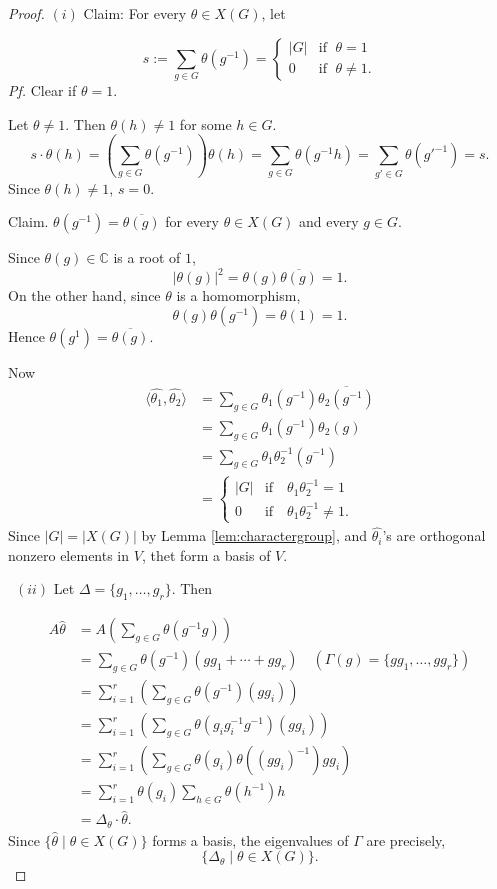 \documentclass[
]{book}
\theoremstyle{definition}
\theoremstyle{definition}
\theoremstyle{definition}
\theoremstyle{definition}
\theoremstyle{remark}
\begin{document}
\begin{proof}
\leavevmode

\((i)\) Claim: For every \(\theta \in X(G)\), let

\[s:= \sum_{g\in G}\theta(g^{-1}) = \begin{cases} |G| & \text{if }\;\theta = 1\\
0 & \text{if } \;\theta \neq 1. 
\end{cases}\]
\emph{Pf.} Clear if \(\theta =1\).

Let \(\theta \neq 1\). Then \(\theta(h)\neq 1\) for some \(h\in G\).
\[s\cdot \theta(h) = \left(\sum_{g\in G}\theta(g^{-1})\right)\theta(h) = \sum_{g\in G}\theta(g^{-1}h) = \sum_{g'\in G}\theta(g'^{-1}) = s.\]
Since \(\theta(h)\neq 1\), \(s = 0\).

Claim. \(\theta(g^{-1}) = \overline{\theta(g)}\) for every \(\theta\in X(G)\) and every \(g\in G\).

Since \(\theta(g)\in \mathbb{C}\) is a root of \(1\),
\[|\theta(g)|^2 = \theta(g)\overline{\theta(g)} = 1.\]
On the other hand, since \(\theta\) is a homomorphism,
\[\theta(g)\theta(g^{-1}) = \theta(1) = 1.\]
Hence \(\theta(g^{1}) = \overline{\theta(g)}\).

Now
\begin{align}
\langle \widehat{\theta_1}, \widehat{\theta_2}\rangle & = \sum_{g\in G}\theta_1(g^{-1})\overline{\theta_2(g^{-1})}\\
& = \sum_{g\in G}\theta_1(g^{-1})\theta_2(g)\\
& = \sum_{g\in G}\theta_1\theta_2^{-1}(g^{-1})\\
& = \begin{cases} |G| & \text{if}\quad \theta_1\theta_2^{-1} = 1\\
0 & \text{if} \quad \theta_1\theta_2^{-1}\neq 1.
\end{cases}
\end{align}
Since \(|G| = |X(G)|\) by Lemma \ref{lem:charactergroup}, and \(\widehat{\theta_i}\)'s are orthogonal nonzero elements in \(V\), thet form a basis of \(V\).

~\((ii)\) Let \(\Delta = \{g_1, \ldots, g_r\}\). Then

\begin{align}
A\hat{\theta} & = A\left(\sum_{g\in G}\theta(g^{-1}g)\right)\\
& = \sum_{g\in G}\theta(g^{-1})(gg_1 + \cdots + gg_r) \quad (\Gamma(g) = \{gg_1, \ldots, gg_r\})\\
& = \sum_{i = 1}^r \left(\sum_{g\in G}\theta(g^{-1})(gg_i)\right)\\
& = \sum_{i=1}^r\left(\sum_{g\in G}\theta(g_ig_i^{-1}g^{-1})(gg_i)\right)\\
& = \sum_{i = 1}^r\left(\sum_{g\in G}\theta(g_i)\theta((gg_i)^{-1})gg_i\right)\\
& = \sum_{i = 1}^r\theta(g_i)\sum_{h\in G}\theta(h^{-1})h \\
& = \Delta_\theta\cdot \hat{\theta}.
\end{align}
Since \(\{\hat{\theta}\mid \theta\in X(G)\}\) forms a basis, the eigenvalues of \(\Gamma\) are precisely,
\[\{\Delta_\theta\mid \theta\in X(G)\}.\]


\end{proof}
\end{document}
